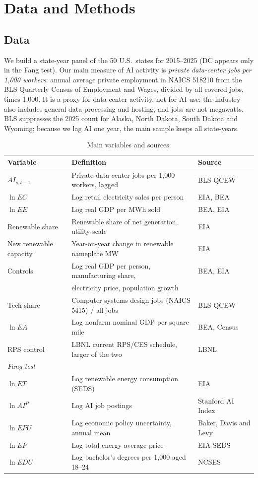 \section{Data and Methods}

\subsection{Data}
We build a state-year panel of the 50 U.S.\ states for 2015--2025 (DC appears only in the Fang test). Our main measure of AI activity is \emph{private data-center jobs per 1,000 workers}: annual average private employment in NAICS 518210 from the BLS Quarterly Census of Employment and Wages, divided by all covered jobs, times 1,000. It is a proxy for data-center activity, not for AI use: the industry also includes general data processing and hosting, and jobs are not megawatts. BLS suppresses the 2025 count for Alaska, North Dakota, South Dakota and Wyoming; because we lag AI one year, the main sample keeps all state-years.

\begin{table}[ht]\centering\small
\begin{tabular}{lll}
\toprule
Variable & Definition & Source \\
\midrule
$AI_{s,t-1}$ & Private data-center jobs per 1,000 workers, lagged & BLS QCEW \\
$\ln EC$ & Log retail electricity sales per person & EIA, BEA \\
$\ln EE$ & Log real GDP per MWh sold & BEA, EIA \\
Renewable share & Renewable share of net generation, utility-scale & EIA \\
New renewable capacity & Year-on-year change in renewable nameplate MW & EIA \\
Controls & Log real GDP per person, manufacturing share, & BEA, EIA \\
 & electricity price, population growth & \\
Tech share & Computer systems design jobs (NAICS 5415) / all jobs & BLS QCEW \\
$\ln EA$ & Log nonfarm nominal GDP per square mile & BEA, Census \\
RPS control & LBNL current RPS/CES schedule, larger of the two & LBNL \\
\midrule
\multicolumn{3}{l}{\emph{Fang test}} \\
$\ln ET$ & Log renewable energy consumption (SEDS) & EIA \\
$\ln AI^{P}$ & Log AI job postings & Stanford AI Index \\
$\ln EPU$ & Log economic policy uncertainty, annual mean & Baker, Davis and Levy \\
$\ln EP$ & Log total energy average price & EIA SEDS \\
$\ln EDU$ & Log bachelor's degrees per 1,000 aged 18--24 & NCSES \\
\bottomrule
\end{tabular}
\caption{Main variables and sources.}
\end{table}

